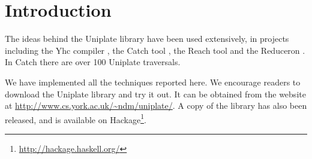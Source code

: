 
\chapter{Introduction}



\cite{haskell} 


The ideas behind the Uniplate library have been used extensively, in projects including the Yhc compiler \citep{me:yhc_core}, the Catch tool \citep{me:catch_tfp}, the Reach tool \cite{naylor:reach} and the Reduceron \cite{naylor:reduceron}. In Catch there are over 100 Uniplate traversals.

We have implemented all the techniques reported here. We encourage readers to download the Uniplate library and try it out. It can be obtained from the website at \url{http://www.cs.york.ac.uk/~ndm/uniplate/}. A copy of the library has also been released, and is available on Hackage\footnote{\url{http://hackage.haskell.org/}}.

